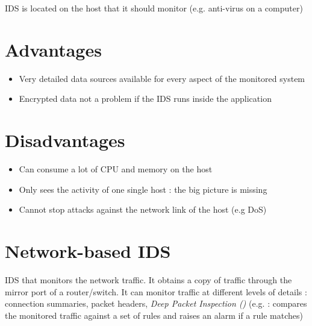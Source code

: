 IDS is located on the host that it should monitor (e.g. anti-virus on a computer)

\begin{minipage}[t]{0.46\textwidth}
    \section{Advantages}
    \begin{itemize}
        \item Very detailed data sources available for every aspect of the monitored system
        \item Encrypted data not a problem if the IDS runs inside the application
    \end{itemize}
\end{minipage}
\hfill
\begin{minipage}[t]{0.46\textwidth}
    \section{Disadvantages}
    \begin{itemize}
        \item Can consume a lot of CPU and memory on the host
        \item Only sees the activity of one single host : the big picture is missing
        \item Cannot stop attacks against the network link of the host (e.g DoS)
    \end{itemize}
\end{minipage}

\section{Network-based IDS}

IDS that monitors the network traffic. It obtains a copy of traffic through the mirror port of a router/switch. It can monitor traffic at different levels of details : connection summaries, packet headers, \textit{Deep Packet Inspection ()} (e.g.  : compares the monitored traffic against a set of rules and raises an alarm if a rule matches)

